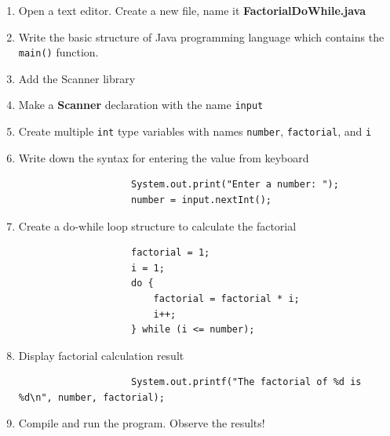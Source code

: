 \documentclass[12pt,titlepage]{article}
\begin{document}
\begin{enumerate}[label=\alph*)]
{        \begin{enumerate}[label=\arabic*.]
            \item Open a text editor. Create a new file, name it \textbf{FactorialDoWhile.java}
            \item Write the basic structure of Java programming language which contains the \texttt{main()} function.
            \item Add the Scanner library
            \item Make a \textbf{Scanner} declaration with the name \texttt{input}
            \item Create multiple \texttt{int} type variables with names \texttt{number}, \texttt{factorial}, and \texttt{i}
            \item {
                Write down the syntax for entering the value from keyboard

                \begin{verbatim}
                    System.out.print("Enter a number: ");
                    number = input.nextInt();
                \end{verbatim}
            }
            \item {
                Create a do-while loop structure to calculate the factorial

                \begin{verbatim}
                    factorial = 1;
                    i = 1;
                    do {
                        factorial = factorial * i;
                        i++;
                    } while (i <= number);
                \end{verbatim}
            }
            \item {
                Display factorial calculation result

                \begin{verbatim}
                    System.out.printf("The factorial of %d is %d\n", number, factorial);
                \end{verbatim}
            }
            \pagebreak
            \item {
                Compile and run the program. Observe the results!

}
\end{enumerate}}
\end{enumerate}
\end{document}
